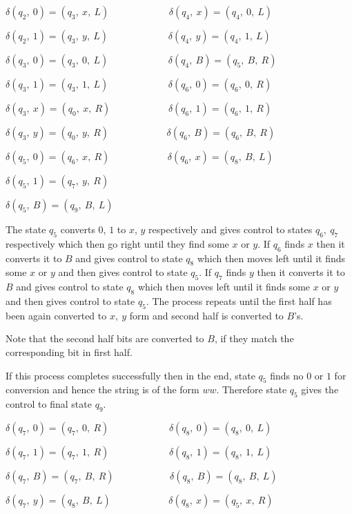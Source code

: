 \documentclass{article}
\begin{document}
    $\delta(q_2,~0)=(q_3,~x,~L)~~~~~~~~~~~~~~~~~~~~~~~~~~~~\delta(q_4,~x)=(q_4,~0,~L)$ 
    
    $\delta(q_2,~1)=(q_3,~y,~L)~~~~~~~~~~~~~~~~~~~~~~~~~~~~\delta(q_4,~y)=(q_4,~1,~L)$ 
    
    $\delta(q_3,~0)=(q_3,~0,~L)~~~~~~~~~~~~~~~~~~~~~~~~~~~~\delta(q_4,~B)=(q_5,~B,~R)$ 
    
    $\delta(q_3,~1)=(q_3,~1,~L)~~~~~~~~~~~~~~~~~~~~~~~~~~~~\delta(q_6,~0)=(q_6,~0,~R)$ 
    
    $\delta(q_3,~x)=(q_0,~x,~R)~~~~~~~~~~~~~~~~~~~~~~~~~~~\delta(q_6,~1)=(q_6,~1,~R)$
    
    $\delta(q_3,~y)=(q_0,~y,~R)~~~~~~~~~~~~~~~~~~~~~~~~~~~\delta(q_6,~B)=(q_6,~B,~R)$
    
    $\delta(q_5,~0)=(q_6,~x,~R)~~~~~~~~~~~~~~~~~~~~~~~~~~~\delta(q_6,~x)=(q_8,~B,~L)$
    
    $\delta(q_5,~1)=(q_7,~y,~R)$
    
    $\delta(q_5,~B)=(q_9,~B,~L)$
    
    The state $q_5$ converts $0$, $1$ to $x$, $y$ respectively and gives control to states $q_6,~q_7$ respectively which then go right until they find some $x$ or $y$. 
    If $q_6$ finds $x$ then it converts it to $B$ and gives control to state $q_8$ which then moves left until it finds some $x$ or $y$ and then gives control to state $q_5$. 
    If $q_7$ finds $y$ then it converts it to $B$ and gives control to state $q_8$ which then moves left until it finds some $x$ or $y$ and then gives control to state $q_5$.
    The process repeats until the first half has been again converted to $x,~y$ form and second half is converted to $B$'s.
    
    Note that the second half bits are converted to $B$, if they match the corresponding bit in first half.
    
    If this process completes successfully then in the end, state $q_5$ finds no $0$ or $1$ for conversion and hence the string is of the form $ww$. Therefore state $q_5$ gives the control to final state $q_9$.
    
    $\delta(q_7,~0)=(q_7,~0,~R)~~~~~~~~~~~~~~~~~~~~~~~~~~~~\delta(q_8,~0)=(q_8,~0,~L)$
    
    $\delta(q_7,~1)=(q_7,~1,~R)~~~~~~~~~~~~~~~~~~~~~~~~~~~~\delta(q_8,~1)=(q_8,~1,~L)$
    
    $\delta(q_7,~B)=(q_7,~B,~R)~~~~~~~~~~~~~~~~~~~~~~~~~~\delta(q_8,~B)=(q_8,~B,~L)$
    
    $\delta(q_7,~y)=(q_8,~B,~L)~~~~~~~~~~~~~~~~~~~~~~~~~~~\delta(q_8,~x)=(q_5,~x,~R)$
    
\end{document}
